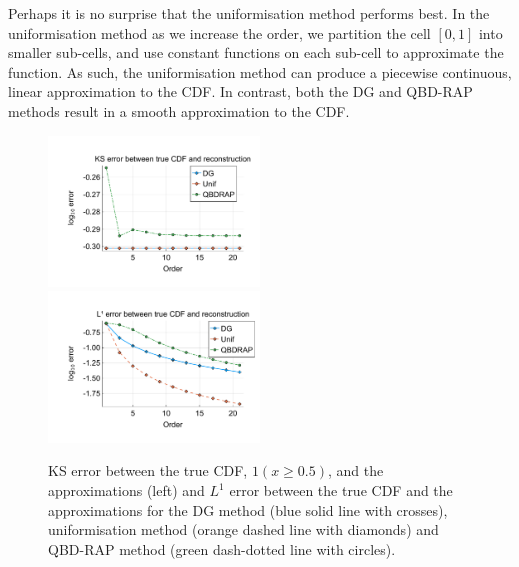 \begin{example}
Perhaps it is no surprise that the uniformisation method performs best. In the uniformisation method as we increase the order, we partition the cell \([0,1]\) into smaller sub-cells, and use constant functions on each sub-cell to approximate the function. As such, the uniformisation method can produce a piecewise continuous, linear approximation to the CDF. In contrast, both the DG and QBD-RAP methods result in a smooth approximation to the CDF. 
\begin{figure}
	\centering
	\includegraphics[width=0.5\textwidth,trim={1.25cm 0.8cm 0.25cm 1.25cm},clip]{chapter6/figs/comp/fun1/meshs_ks_error_formatted.pdf}%
	\includegraphics[width=0.5\textwidth,trim={1.25cm 0.8cm 0.25cm 1.25cm},clip]{chapter6/figs/comp/fun1/meshs_l1_cdf_error_formatted.pdf}
	\caption{KS error between the true CDF, \(1(x\geq 0.5)\), and the approximations (left) and \(L^1\) error between the true CDF and the approximations for the DG method (blue solid line with crosses), uniformisation method (orange dashed line with diamonds) and QBD-RAP method (green dash-dotted line with circles).}
	\label{fig: fun 1 comp} 
\end{figure}


\end{example}
